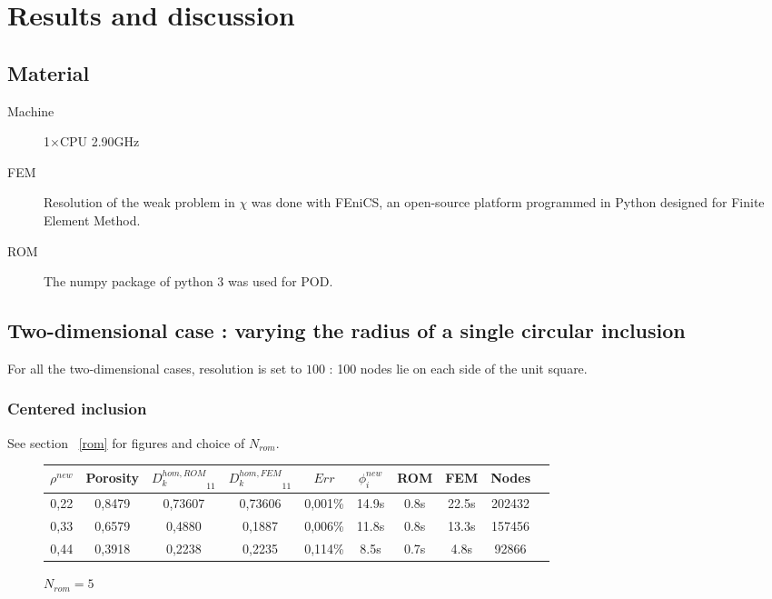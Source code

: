 \section{Results and discussion}\label{res}

\subsection{Material}

\begin{description}
\item [Machine] 1$\times$CPU 2.90GHz
\item [FEM] Resolution of the weak problem in $\chi$ was done with FEniCS, %
an open-source platform programmed in Python designed for Finite Element Method.
\item [ROM] The numpy package of python 3 was used for POD.
\end{description}

\subsection{Two-dimensional case : varying the radius of a single circular inclusion}

For all the two-dimensional cases, resolution is set to $100$ : %
100 nodes lie on each side of the unit square.

\subsubsection{Centered inclusion}

See section \ \ref{rom} for figures and choice of $N_{rom}$.

\begin{figure}[H]%
%
\begin{center}
\begin{tabular}{|c|c||c|c||c|c||c|c||c||c|}
\hline
$\rho^{new}$&Porosity&${D_k^{hom,ROM}}_{11}$&${D_k^{hom,FEM}}_{11}$&$Err$&$\phi_i^{new}$&ROM&FEM&Nodes\\
\hline
0,22&0,8479&0,73607&0,73606&0,001\%&14.9s&0.8s&22.5s&202432\\
\hline
0,33&0,6579&0,4880&0,1887&0,006\%&11.8s&0.8s&13.3s&157456\\
\hline
0,44&0,3918&0,2238&0,2235&0,114\%&8.5s&0.7s&4.8s&92866\\
\hline
\end{tabular}
\end{center}
\caption{$N_{rom}=5$}
%
\end{figure}

